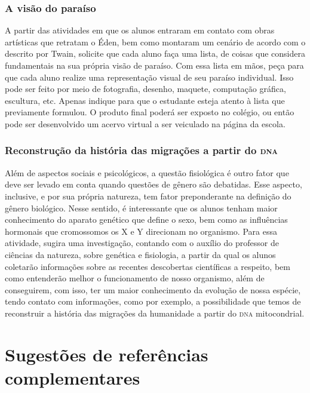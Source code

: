 \documentclass[12pt]{extarticle}
\begin{document}
\subsubsection{A visão do paraíso}

A partir das atividades em que os alunos entraram em contato
com obras artísticas que retratam o Éden, bem como montaram um cenário
de acordo com o descrito por Twain, solicite que cada aluno faça uma
lista, de coisas que considera fundamentais na sua própria visão de
paraíso. Com essa lista em mãos, peça para que cada aluno realize uma
representação visual de seu paraíso individual. Isso pode ser feito
por meio de fotografia, desenho, maquete, computação gráfica,
escultura, etc. Apenas indique para que o estudante esteja atento à
lista que previamente formulou. O produto final poderá ser exposto no
colégio, ou então pode ser desenvolvido um acervo virtual a ser
veiculado na página da escola.

\subsubsection{Reconstrução da história das
migrações a partir do \textsc{dna}}

Além de aspectos sociais e psicológicos, a questão fisiológica é outro
fator que deve ser levado em conta quando questões de gênero são
debatidas. Esse aspecto, inclusive, e por sua própria natureza, tem
fator preponderante na definição do gênero biológico. Nesse sentido, é
interessante que os alunos tenham maior conhecimento do aparato
genético que define o sexo, bem como as influências hormonais que
cromossomos os X e Y direcionam no organismo. Para essa atividade,
sugira uma investigação, contando com o auxílio do professor de
ciências da natureza, sobre genética e fisiologia, a partir da qual os
alunos coletarão informações sobre as recentes descobertas científicas
a respeito, bem como entenderão melhor o funcionamento de nosso
organismo, além de conseguirem, com isso, ter um maior conhecimento da
evolução de nossa espécie, tendo contato com informações, como por
exemplo, a possibilidade que temos de reconstruir a história das
migrações da humanidade a partir do \textsc{dna} mitocondrial.

\section{Sugestões de referências complementares}\label{sugestoes}
\end{document}

